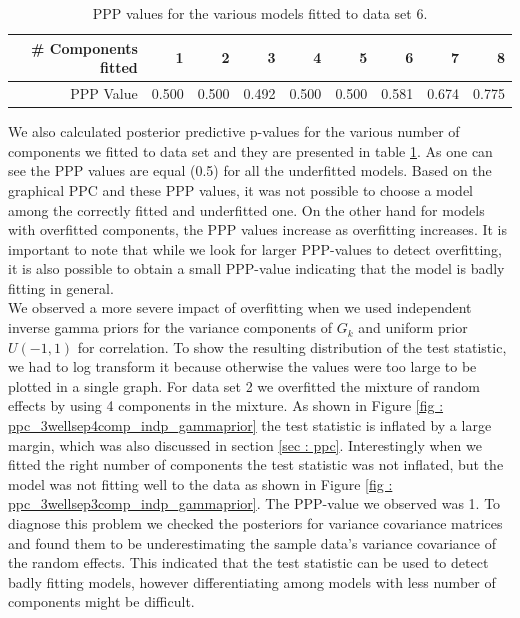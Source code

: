 \begin{table}[!htb]
\centering
\captionsetup{justification=centering}
\caption{PPP values for the various models fitted to data set 6.}
\label{table : ppp_value_5welsepcomp}
\begin{tabular}{@{}rrrrrrrrr@{}}
\toprule
\# Components fitted & 1 & 2 & 3 & 4 & 5 & 6 & 7 & 8 \\ \midrule
PPP Value & 0.500 & 0.500 & 0.492 & 0.500 & 0.500 & 0.581 & 0.674 & 0.775 \\ \bottomrule
\end{tabular}
\end{table}

We also calculated posterior predictive p-values for the various number of components we fitted to data set and they are presented in table \ref{table : ppp_value_5welsepcomp}. As one can see the PPP values are equal (0.5) for all the underfitted models. Based on the graphical PPC and these PPP values, it was not possible to choose a model among the correctly fitted and underfitted one. On the other hand for models with overfitted components, the PPP values increase as overfitting increases. It is important to note that while we look for larger PPP-values to detect overfitting, it is also possible to obtain a small PPP-value indicating that the model is badly fitting in general.\\

We observed a more severe impact of overfitting when we used independent inverse gamma priors for the variance components of $G_k$ and uniform prior $U(-1,1)$ for correlation. To show the resulting distribution of the test statistic, we had to log transform it because otherwise the values were too large to be plotted in a single graph. For data set 2 we overfitted the mixture of random effects by using 4 components in the mixture. As shown in Figure \ref{fig : ppc_3wellsep4comp_indp_gammaprior} the test statistic is inflated by a large margin, which was also discussed in section \ref{sec : ppc}. Interestingly when we fitted the right number of components the test statistic was not inflated, but the model was not fitting well to the data as shown in Figure \ref{fig : ppc_3wellsep3comp_indp_gammaprior}. The PPP-value we observed was 1. To diagnose this problem we checked the posteriors for variance covariance matrices and found them to be underestimating the sample data's variance covariance of the random effects. This indicated that the test statistic can be used to detect badly fitting models, however differentiating among models with less number of components might be difficult.\\

